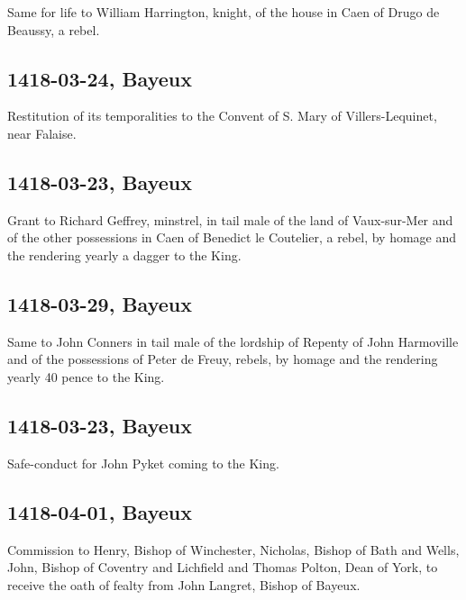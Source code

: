 \documentclass[a4paper,12pt,twoside]{book}
\begin{document}
                  Same for life to William Harrington, knight, of the house in Caen of Drugo de Beaussy, a rebel.
               
            \subsection{1418-03-24, Bayeux}
            
                  Restitution of its temporalities to the Convent of S. Mary of Villers-Lequinet, near Falaise.
               
            \subsection{1418-03-23, Bayeux}
            
                  Grant to Richard Geffrey, minstrel, in tail male of the land of Vaux-sur-Mer and of the other possessions in Caen of Benedict le Coutelier, a rebel, by homage and the rendering yearly a dagger to the King.
               
            \subsection{1418-03-29, Bayeux}
            
                  Same to John Conners in tail male of the lordship of Repenty of John Harmoville and of the possessions of Peter de Freuy, rebels, by homage and the rendering yearly 40 pence to the King.
               
            \subsection{1418-03-23, Bayeux}
            
                  Safe-conduct for John Pyket coming to the King.
               
            \subsection{1418-04-01, Bayeux}
            
                  Commission to Henry, Bishop of Winchester, Nicholas, Bishop of Bath and Wells, John, Bishop of Coventry and Lichfield and Thomas Polton, Dean of York, to receive the oath of fealty from John Langret, Bishop of Bayeux.
               
\end{document}
